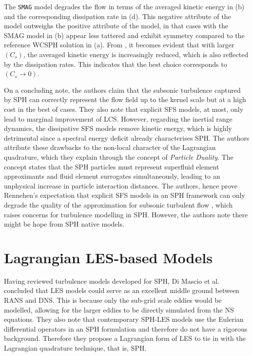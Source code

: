The \texttt{SMAG} model degrades the flow in terms of the averaged kinetic energy in  (b) and the corresponding dissipation rate in  (d). This negative attribute of the model outweighs the positive attribute of the model, in that cases with the SMAG model in  (b) appear less tattered and exhibit symmetry compared to the reference WCSPH solution in  (a).
From , it becomes evident that with larger $(C_s)$, the averaged kinetic energy is increasingly reduced, which is also reflected by the dissipation rates. This indicates that the best choice corresponds to $(C_s \rightarrow 0)$.

On a concluding note, the authors claim that the subsonic turbulence captured by SPH can correctly represent the flow field up to the kernel scale but at a high cost in the best of cases. They also note that explicit SFS
models, at most, only lead to marginal improvement of LCS. However, regarding the inertial range dynamics, the dissipative SFS models remove kinetic energy, which is highly detrimental since a spectral energy deficit already characterises SPH. The authors attribute these drawbacks to the non-local character of the Lagrangian quadrature, which they explain through the concept of \textit{Particle Duality}. The concept states that the SPH particles must represent superfluid element approximants and fluid element surrogates simultaneously, leading to an unphysical increase in particle interaction distances. The authors, hence
prove Rennehen’s expectation that explicit SFS models in an SPH framework can only degrade the quality of the approximation for subsonic turbulent flow \parencite{rennehan2021mixing}, which raises concerns for turbulence modelling in SPH. However, the authors note there might be hope from SPH native models.

\section{Lagrangian LES-based Models}
Having reviewed turbulence models developed for SPH, Di Mascio et al. \parencite{DiMascio2017} concluded that LES models could serve as an excellent middle ground between RANS and DNS. This is because only the sub-grid scale eddies would be modelled, allowing for the larger eddies to be directly simulated from the NS equations. They also note that contemporary SPH-LES models use the Eulerian differential operators in an SPH formulation and therefore do not have a rigorous background. Therefore they propose a Lagrangian form of LES to tie in with the Lagrangian quadrature technique, that is, SPH. 


